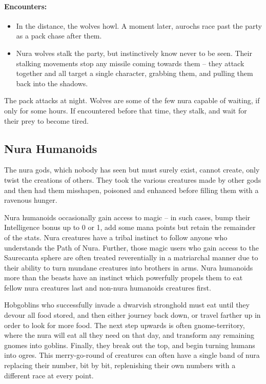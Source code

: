 \begin{multicols}{2}
\paragraph{Encounters:}

\begin{itemize}

  \item
  In the distance, the wolves howl.
  A moment later, aurochs race past the party as a pack chase after them.
  \item
  Nura wolves stalk the party, but instinctively know never to be seen.
  Their stalking movements stop any missile coming towards them -- they attack together and all target a single character, grabbing them, and pulling them back into the shadows.

\end{itemize}

The pack attacks at night.
Wolves are some of the few nura capable of waiting, if only for some hours.
If encountered before that time, they stalk, and wait for their prey to become tired.


\subsection{Nura Humanoids}

The nura gods, which nobody has seen but must surely exist, cannot create, only twist the creations of others.  They took the various creatures made by other gods and then had them misshapen, poisoned and enhanced before filling them with a ravenous hunger.

Nura humanoids occasionally gain access to magic -- in such cases, bump their Intelligence bonus up to 0 or 1, add some mana points but retain the remainder of the stats.
Nura creatures have a tribal instinct to follow anyone who understands the Path of Nura.
Further, those magic users who gain access to the Saurecanta sphere are often treated reverentially in a matriarchal manner due to their ability to turn mundane creatures into brothers in arms.
Nura humanoids more than the beasts have an instinct which powerfully propels them to eat fellow nura creatures last and non-nura humanoids creatures first.

Hobgoblins who successfully invade a dwarvish stronghold must eat until they devour all food stored, and then either journey back down, or travel farther up in order to look for more food.
The next step upwards is often gnome-territory, where the nura will eat all they need on that day, and transform any remaining gnomes into goblins.
Finally, they break out the top, and begin turning humans into ogres.
This merry-go-round of creatures can often have a single band of nura replacing their number, bit by bit, replenishing their own numbers with a different race at every point.


\end{multicols}
